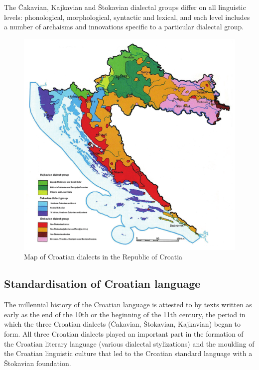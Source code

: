 \begin{multicols}{2}
The Čakavian, Kajkavian and Štokavian dialectal groups differ on all linguistic levels: phonological, morphological, syntactic and lexical, and each level includes a number of archaisms and innovations specific to a particular dialectal group.

\begin{figure}[htb]
  \center
  \includegraphics[width=\textwidth]{../_media/croatian/map-dialects}
  \caption{Map of Croatian dialects in the Republic of Croatia}
  \label{fig:dijalekti_en}
\end{figure}


\subsection{Standardisation of Croatian language}

The millennial history of the Croatian language is attested to by texts written as early as the end of the 10th or the beginning of the 11th century, the period in which the three Croatian dialects (Čakavian, Štokavian, Kajkavian) began to form. All three Croatian dialects played an important part in the formation of the Croatian literary language (various dialectal stylizations) and the moulding of the Croatian linguistic culture that led to the Croatian standard language with a Štokavian foundation.


\end{multicols}
